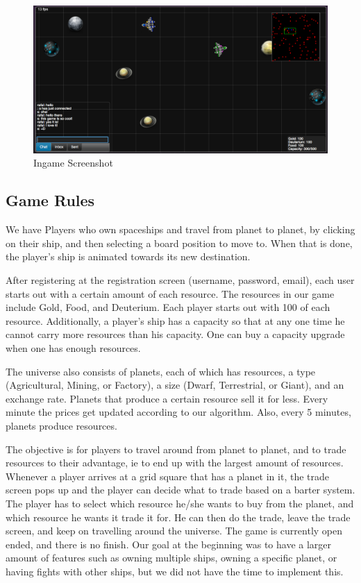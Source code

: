 \documentclass[a4paper,11pt]{article}
\begin{document}
		\begin{figure}[htb]
		\begin{center}
		\leavevmode
		\includegraphics[scale=0.35]{screen1.png}
		\end{center}
		\caption{Ingame Screenshot}
		\label{fig:ingame1}
		\end{figure}
	
		\subsection{Game Rules}
		
			We have Players who own spaceships and travel from planet to planet, by clicking on their ship, and then selecting a board position to move to. When that is done, the player's ship is animated towards its new destination.
		
			After registering at the registration screen (username, password, email), each user starts out with a certain amount of each resource. The resources in our game include Gold, Food, and Deuterium. Each player starts out with 100 of each resource. Additionally, a player's ship has a capacity so that at any one time he cannot carry more resources than his capacity. One can buy a capacity upgrade when one has enough resources.
		
			The universe also consists of planets, each of which has resources, a type (Agricultural, Mining, or Factory), a size (Dwarf, Terrestrial, or Giant), and an exchange rate. Planets that produce a certain resource sell it for less. Every minute the prices get updated according to our algorithm. Also, every 5 minutes, planets produce resources.
		
			The objective is for players to travel around from planet to planet, and to trade resources to their advantage, ie to end up with the largest amount of resources. Whenever a player arrives at a grid square that has a planet in it, the trade screen pops up and the player can decide what to trade based on a barter system. The player has to select which resource he/she wants to buy from the planet, and which resource he wants it trade it for. He can then do the trade, leave the trade screen, and keep on travelling around the universe. The game is currently open ended, and there is no finish. Our goal at the beginning was to have a larger amount of features such as owning multiple ships, owning a specific planet, or having fights with other ships, but we did not have the time to implement this.
			
\end{document}
